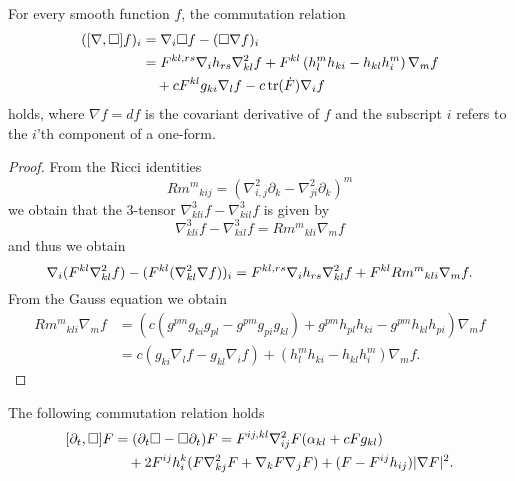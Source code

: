 \documentclass{amsart}
\begin{document}
\begin{lemma}
\label{lem:gradBox}
For every smooth function $f$, the commutation relation
\[
\begin{split}
([\nabla, \Box]f)_i &= \nabla_i \Box f - (\Box \nabla f)_i\\ 
                &= F^{kl,rs} \nabla_i h_{rs} \nabla^2_{kl} f + F^{kl}\left(h^{m}_{l}h_{ki} - h_{kl}h^{m}_{i}\right) \nabla_m f \\
&\quad + c F^{kl} g_{ki} \nabla_l f - c \operatorname{tr}(\dot{F}) \nabla_i f 
\end{split}
\]
holds, where \(\nabla f = df\) is the covariant derivative of \(f\) and the subscript \(i\) refers to the \(i\)'th component of a one-form.
\end{lemma}
\begin{proof}
From the Ricci identities
\[
{Rm^m}_{kij}  = \left(\nabla^2_{i, j} \partial_k - \nabla^2_{ji} \partial_k\right)^m
\]
we obtain that the $3$-tensor $\nabla^3_{kli}f-\nabla^3_{kil}f$
is given by
\[
\nabla^3_{kli}f-\nabla^3_{kil}f={Rm^m}_{kli}\nabla_m f
\]
and thus we obtain
\[
\nabla_i (F^{kl} \nabla^2_{kl} f) - (F^{kl}(\nabla^2_{kl} \nabla f))_i = F^{kl,rs} \nabla_i h_{rs} \nabla^2_{kl}f + F^{kl}{Rm^{m}}_{kli} \nabla_m f.
\]
From the Gauss equation we obtain
\[
\begin{split}
{Rm^{m}}_{kli} \nabla_m f &= \left(c\left(g^{pm}g_{ki}g_{pl}  - g^{pm}g_{pi}g_{kl}\right) + g^{pm} h_{pl}h_{ki} - g^{pm}h_{kl}h_{pi}\right) \nabla_m f \\
&= c\left(g_{ki} \nabla_l f - g_{kl} \nabla_i f\right) + \left(h^{m}_{l}h_{ki} - h_{kl}h^{m}_{i}\right) \nabla_m f.
\end{split}
\]
\end{proof}
\begin{lemma}
\label{lem:deltBox}
The following commutation relation holds
\[
\begin{split}
[\partial_t, \Box] F &= (\partial_{t}\Box - \Box\partial_{t}) F = F^{ij,kl} \nabla^2_{ij} F (\alpha_{kl} + c F g_{kl}) \\
&\quad + 2F^{ij}h^{k}_{i} (F \nabla^2_{k
j} F + \nabla_k F \nabla_j F) + (F - F^{ij}h_{ij})| \nabla F|^{2}.
\end{split}
\]
\end{lemma}
\end{document}
